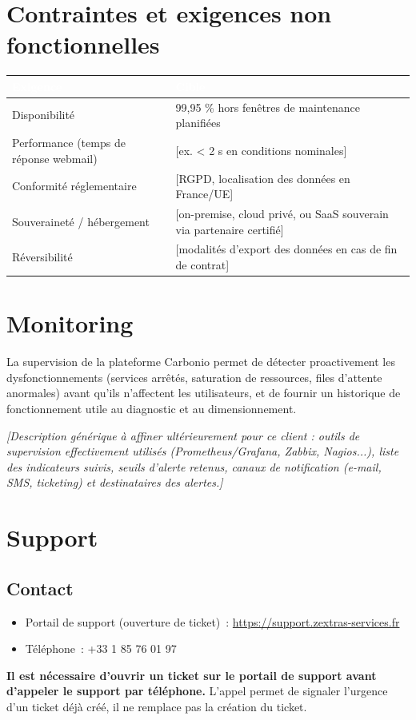 \documentclass[11pt,a4paper]{report}
\newcommand{\placeholder}[1]{\textit{\textcolor{placeholdercol}{[#1]}}\par\vspace{4pt}}
\newcommand{\tblhead}[1]{\textcolor{white}{\textbf{#1}}}
\begin{document}
\chapter{Contraintes et exigences non fonctionnelles}
\begin{longtable}{|p{6cm}|p{6.5cm}|}
\hline
\rowcolor{primary}\tblhead{Exigence} & \tblhead{Cible} \\
\hline
\endhead
Disponibilité & 99,95 \% hors fenêtres de maintenance planifiées \\
\hline
Performance (temps de réponse webmail) & [ex. < 2 s en conditions nominales] \\
\hline
Conformité réglementaire & [RGPD, localisation des données en France/UE] \\
\hline
Souveraineté / hébergement & [on-premise, cloud privé, ou SaaS souverain via partenaire certifié] \\
\hline
Réversibilité & [modalités d'export des données en cas de fin de contrat] \\
\hline
\end{longtable}

\chapter{Monitoring}
La supervision de la plateforme Carbonio permet de détecter proactivement les dysfonctionnements (services arrêtés, saturation de ressources, files d'attente anormales) avant qu'ils n'affectent les utilisateurs, et de fournir un historique de fonctionnement utile au diagnostic et au dimensionnement.

\placeholder{Description générique à affiner ultérieurement pour ce client : outils de supervision effectivement utilisés (Prometheus/Grafana, Zabbix, Nagios...), liste des indicateurs suivis, seuils d'alerte retenus, canaux de notification (e-mail, SMS, ticketing) et destinataires des alertes.}

\chapter{Support}

\section{Contact}
\begin{itemize}[nosep]
  \item Portail de support (ouverture de ticket)~: \url{https://support.zextras-services.fr }
  \item Téléphone~: +33 1 85 76 01 97
\end{itemize}
\textbf{Il est nécessaire d'ouvrir un ticket sur le portail de support avant d'appeler le support par téléphone.} L'appel permet de signaler l'urgence d'un ticket déjà créé, il ne remplace pas la création du ticket.
\end{document}
